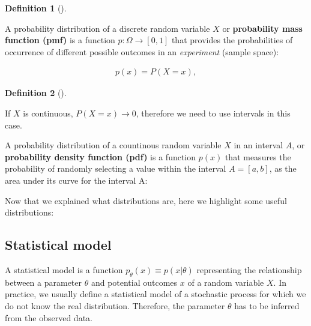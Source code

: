 \documentclass[
  letterpaper,
  12pt,
  british]{tufte-book}
\theoremstyle{plain}
\theoremstyle{definition}
\newtheorem{definition}{Definition}[chapter]
\theoremstyle{plain}
\theoremstyle{remark}
\begin{document}
\leavevmode{}%
\begin{definition}[]\label{def-probability_mass_function}

A probability distribution of a discrete random variable \(\mathit{X}\)
or \textbf{probability mass function (pmf)} is a function
\(p: \Omega \to [0,1]\) that provides the probabilities of occurrence of
different possible outcomes in an \emph{experiment} (sample space):

\end{definition}

\begin{align}
        p(\mathit{x}) = P(\mathit{X}= \mathit{x}), 
\end{align}

\leavevmode{}%
\begin{definition}[]\label{def-probability_density_function}

If \(\mathit{X}\) is continuous, \(P(\mathit{X}=\mathit{x})\to 0\),
therefore we need to use intervals in this case.

\end{definition}

A probability distribution of a countinous random variable
\(\mathit{X}\) in an interval \(A\), or \textbf{probability density
function (pdf)} is a function \(p(\mathit{x})\) that measures the
probability of randomly selecting a value within the interval
\(A=[a, b]\), as the area under its curve for the interval A:

Now that we explained what distributions are, here we highlight some
useful distributions:

\hypertarget{sec-statistical_model}{%
\subsection{Statistical model}\label{sec-statistical_model}}

A statistical model is a function
\(p_{\theta}(\mathit{x}) \equiv p(\mathit{x}| \theta)\) representing the
relationship between a parameter \(\theta\) and potential
outcomes \(\mathit{x}\) of a random variable \(\mathit{X}\). In
practice, we usually define a statistical model of a stochastic process
for which we do not know the real distribution. Therefore, the parameter
\(\theta\) has to be inferred from the observed data.
\end{document}
